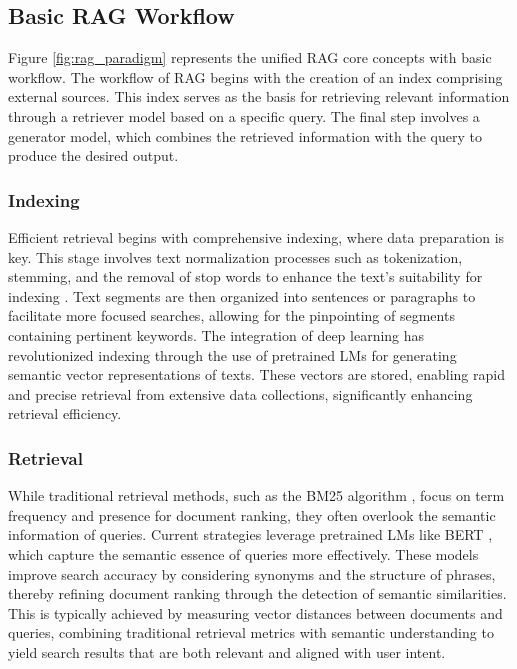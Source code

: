 \subsection{Basic RAG Workflow}
 Figure \ref{fig:rag_paradigm} represents the unified RAG core concepts with basic workflow. The workflow of RAG begins with the creation of an index comprising external sources. This index serves as the basis for retrieving relevant information through a retriever model based on a specific query. The final step involves a generator model, which combines the retrieved information with the query to produce the desired output. 

\subsubsection{Indexing}
Efficient retrieval begins with comprehensive indexing, where data preparation is key. This stage involves text normalization processes such as tokenization, stemming, and the removal of stop words to enhance the text's suitability for indexing \cite{DBLP:books/daglib/0021593}. Text segments are then organized into sentences or paragraphs to facilitate more focused searches, allowing for the pinpointing of segments containing pertinent keywords. The integration of deep learning has revolutionized indexing through the use of pretrained LMs for generating semantic vector representations of texts. These vectors are stored, enabling rapid and precise retrieval from extensive data collections, significantly enhancing retrieval efficiency.

\subsubsection{Retrieval}
While traditional retrieval methods, such as the BM25 algorithm \cite{DBLP:conf/trec/Hancock-BeaulieuGHRWW96}, focus on term frequency and presence for document ranking, they often overlook the semantic information of queries. Current strategies leverage pretrained LMs like BERT \cite{devlin2019bert}, which capture the semantic essence of queries more effectively. These models improve search accuracy by considering synonyms and the structure of phrases, thereby refining document ranking through the detection of semantic similarities. This is typically achieved by measuring vector distances between documents and queries, combining traditional retrieval metrics with semantic understanding to yield search results that are both relevant and aligned with user intent.

